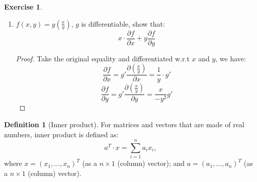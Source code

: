 \documentclass[12pt]{article}
\theoremstyle{definition}
\newtheorem{definition}[theorem]{Definition}
\newtheorem{exercise}[theorem]{Exercise}
\theoremstyle{plain}
\begin{document}
\begin{exercise}
\begin{enumerate}
\begin{proof}
                    Now, take this simplified functional form for 
                    $\frac{\partial f }{ \partial u} = f_x + f_y$, look 
                    into: 
                    \[
                        \frac{\partial^2 f}{\partial u^2} = f_{xx} \cdot 
                        \frac{\partial x}{ \partial u} + f_{xy} \cdot 
                        \frac{\partial y}{\partial u} + f_{yx} \cdot 
                        \frac{\partial x}{\partial u} + 
                        f_{y y} \cdot \frac{\partial 
                        y}{\partial u}
                    \]
                    Simplify this by evaluating $\frac{\partial x}{\partial 
                    u} = 1 = \frac{\partial y}{\partial u}$ and get the 
                    expression we wanted to show.
            \end{proof}
        \item $f(x,y) = g(\frac{x}{y})$, $g$ is differentiable, show that: 
            \[ 
                x \cdot \frac{\partial f }{ \partial x} + y 
                \frac{\partial f}{ \partial y}
            \]
            \begin{proof}
                Take the original equality and differentiated w.r.t $x$ and 
                $y$, we have: 
                \[
                    \frac{\partial f}{\partial x} = g' \frac{\partial 
                    \left( \frac{x}{y} \right)}{\partial x} = \frac{1}{y} \cdot g'
                \]
                \[
                    \frac{\partial f}{\partial y} = g' \frac{\partial \left( 
                    \frac{x}{y} \right)}{\partial y} =  \frac{x}{-y^2} g'
                \]
            \end{proof}
    \end{enumerate}
\end{exercise}

\begin{definition}
    [Inner product]
    For matrices and vectors that are made of real numbers, inner product is 
    defined as: 
    \[
        a^T\cdot x = \sum_{i=1}^n a_i x_i,
    \]
    where $x = (x_1, \ldots, x_n)^T$ (as a $n\times 1$ (column) vector); and $a = 
    (a_1, \ldots, a_n)^T$ (as a $n\times 1$ (column) vector).
\end{definition}








\end{document}
